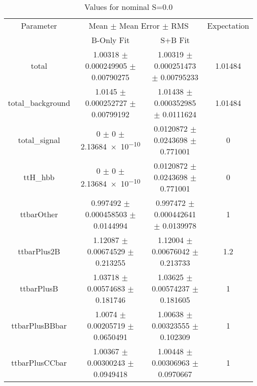\begin{table}
\centering
\caption{Values for nominal S=0.0}
\begin{tabular}{cccc}
\toprule
Parameter & \multicolumn{2}{c}{Mean $\pm$ Mean Error $\pm$ RMS} & Expectation\\
 & B-Only Fit & S+B Fit & \\
\midrule
total & \num{1.00318} $\pm$ \num{0.000249905} $\pm$ \num{0.00790275} & \num{1.00319} $\pm$ \num{0.000251473} $\pm$ \num{0.00795233} & \num{1.01484}\\
total\_background & \num{1.0145} $\pm$ \num{0.000252727} $\pm$ \num{0.00799192} & \num{1.01438} $\pm$ \num{0.000352985} $\pm$ \num{0.0111624} & \num{1.01484}\\
total\_signal & \num{0} $\pm$ \num{0} $\pm$ \num{2.13684e-10} & \num{0.0120872} $\pm$ \num{0.0243698} $\pm$ \num{0.771001} & \num{0}\\
ttH\_hbb & \num{0} $\pm$ \num{0} $\pm$ \num{2.13684e-10} & \num{0.0120872} $\pm$ \num{0.0243698} $\pm$ \num{0.771001} & \num{0}\\
ttbarOther & \num{0.997492} $\pm$ \num{0.000458503} $\pm$ \num{0.0144994} & \num{0.997472} $\pm$ \num{0.000442641} $\pm$ \num{0.0139978} & \num{1}\\
ttbarPlus2B & \num{1.12087} $\pm$ \num{0.00674529} $\pm$ \num{0.213255} & \num{1.12004} $\pm$ \num{0.00676042} $\pm$ \num{0.213733} & \num{1.2}\\
ttbarPlusB & \num{1.03718} $\pm$ \num{0.00574683} $\pm$ \num{0.181746} & \num{1.03625} $\pm$ \num{0.00574237} $\pm$ \num{0.181605} & \num{1}\\
ttbarPlusBBbar & \num{1.0074} $\pm$ \num{0.00205719} $\pm$ \num{0.0650491} & \num{1.00638} $\pm$ \num{0.00323555} $\pm$ \num{0.102309} & \num{1}\\
ttbarPlusCCbar & \num{1.00367} $\pm$ \num{0.00300243} $\pm$ \num{0.0949418} & \num{1.00448} $\pm$ \num{0.00306963} $\pm$ \num{0.0970667} & \num{1}\\
\bottomrule
\end{tabular}
\end{table}